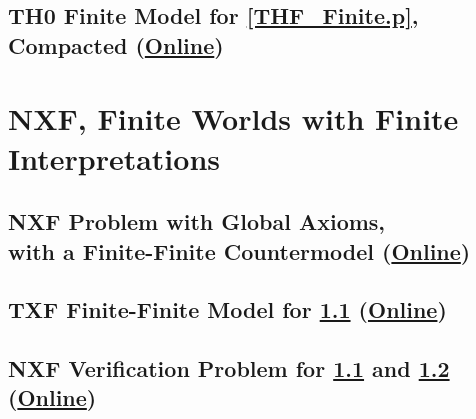 \documentclass{easychair}
\begin{document}
\newpage
\subsection{TH0 Finite Model for \ref{THF_Finite.p}, Compacted
(\href{https://raw.githubusercontent.com/GeoffsPapers/InterpretationFormat/master/Examples/THF_Finite_Compact.s}{Online})}
\label{THF_Finite_Compact.s}
\begin{small}

\end{small}

\newpage
\section{NXF, Finite Worlds with Finite Interpretations}
\label{NXF}

\subsection{NXF Problem with Global Axioms, \\ with a Finite-Finite Countermodel
(\href{https://raw.githubusercontent.com/GeoffsPapers/InterpretationFormat/master/Examples/NXF_Finite-Finite-Global.p}{Online})}
\label{NXF_Finite-Finite-Global.p}
\begin{small}

\end{small}

\newpage
\subsection{TXF Finite-Finite Model for \ref{NXF_Finite-Finite-Global.p}
(\href{https://raw.githubusercontent.com/GeoffsPapers/InterpretationFormat/master/Examples/NXF_Finite-Finite-Global.s}{Online})}
\label{NXF_Finite-Finite-Global.s}
\begin{small}

\end{small}

\newpage
\subsection{NXF Verification Problem for \ref{NXF_Finite-Finite-Global.p} and 
\ref{NXF_Finite-Finite-Global.s}
(\href{https://raw.githubusercontent.com/GeoffsPapers/InterpretationFormat/master/Examples/NXF_Finite-Finite-Global.s.p}{Online})}
\label{NXF_Finite-Finite-Global.s.p}
\begin{small}

\end{small}
\end{document}
